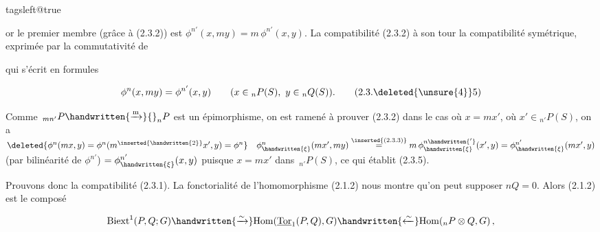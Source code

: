 \begingroup\csname tagsleft@true\endcsname

or le premier membre (grâce à (2.3.2)) est $\phi^{n'}(x,my)=m\,\phi^{n'}(x,y)$. La compatibilité  (2.3.2)  à son tour  la compatibilité symétrique, exprimée par la commutativité de


qui s'écrit en formules

\[\phi^n(x,my)=\phi^{n'}(x,y)\qquad (x\in{}_nP(S),\ y\in{}_nQ(S)).\tag*{(2.3.\deleted{\unsure{4}}5)}\]

 Comme $\,{}_{mn'}P\handwritten{\xrightarrow{\mathrm m}}{}_nP$ est un épimorphisme, on est ramené à prouver (2.3.2) dans le cas où $x=mx'$, où $x'\in{}_{n'}P(S)$,  on a $\deleted{\phi^n(mx,y)=\phi^n(m^{\inserted{\handwritten{2}}}x',y)=\phi^n}\quad\phi_{\handwritten{\xi}}^n(mx',my)\overset{\inserted{\text{(2.3.3)}}}{=}m\,\phi_{\handwritten{\xi}}^{n\handwritten{'}}(x',y)=\phi_{\handwritten{\xi}}^{n'}(mx',y)$ (par bilinéarité de $\phi^{n'}$) $=\phi_{\handwritten{\xi}}^{n'}(x,y)$ puisque $x=mx'$ dans $\,{}_{n'}P(S)$, ce qui établit (2.3.5).

Prouvons donc la compatibilité (2.3.1). La fonctorialité de l'homomorphisme (2.1.2) nous montre qu'on peut supposer $nQ=0$. Alors (2.1.2) est le composé

\[\mathrm{Biext}^1(P,Q;G)\handwritten{\xrightarrow{\sim}}\mathrm{Hom}(\underline{\mathrm{Tor}}_1(P,Q),G)\handwritten{\xleftarrow{\sim}}\mathrm{Hom}({}_nP\otimes Q,G)\,,\]

